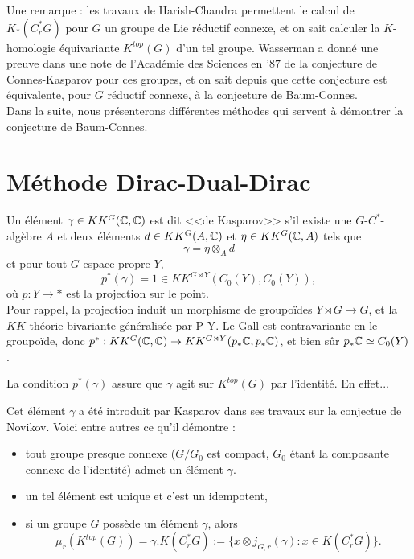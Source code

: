 Une remarque : les travaux de Harish-Chandra permettent le calcul de $K_*(C^*_r G)$ pour $G$ un groupe de Lie réductif connexe, et on sait calculer la $K$-homologie équivariante $K^{top}(G)$ d'un tel groupe. Wasserman a donné une preuve dans une note de l'Académie des Sciences en '$87$ de la conjecture de Connes-Kasparov pour ces groupes, et on sait depuis que cette conjecture est équivalente, pour $G$ réductif connexe, à la conjceture de Baum-Connes.\\

Dans la suite, nous présenterons différentes méthodes qui servent à démontrer la conjecture de Baum-Connes.\\

\section{Méthode Dirac-Dual-Dirac}

\begin{definition}
Un élément $\gamma \in KK^{G}(\mathbb C,\mathbb C)$ est dit <<de Kasparov>> s'il existe une $G$-$C^*$-algèbre $A$ et deux éléments $d\in KK^{G}(A,\mathbb C)$ et $\eta \in KK^{G}(\mathbb C,A)$ tels que
\[\gamma = \eta \otimes_A d \]
et pour tout $G$-espace propre $Y$,
\[p^*(\gamma)=1\in KK^{G\rtimes Y}(C_0(Y),C_0(Y)),\]
où $p : Y\rightarrow *$ est la projection sur le point. \\

Pour rappel, la projection induit un morphisme de groupoïdes $Y \rtimes G\rightarrow G$, et la $KK$-théorie bivariante généralisée par P-Y. Le Gall est contravariante en le groupoïde, donc $p^* : KK^G(\mathbb C,\mathbb C)\rightarrow KK^{G\rtimes Y}(p_* \mathbb C,p_* \mathbb C)$, et bien sûr $p_*\mathbb C \simeq C_0(Y)$.
\end{definition}%

La condition $p^*(\gamma)$ assure que $\gamma$ agit sur $K^{top}(G)$ par l'identité. En effet...

Cet élément $\gamma$ a été introduit par Kasparov dans ses travaux sur la conjectue de Novikov. Voici entre autres ce qu'il démontre :
\begin{itemize}
\item tout groupe presque connexe ($G/G_0$ est compact, $G_0$ étant la composante connexe de l'identité) admet un élément $\gamma$.
\item un tel élément est unique et c'est un idempotent,
\item si un groupe $G$ possède un élément $\gamma$, alors 
\[\mu_r(K^{top}(G)) = \gamma.K(C^*_r G) := \{x\otimes j_{G,r}(\gamma) : x\in K(C^*_r G)\}.\]
\end{itemize}

